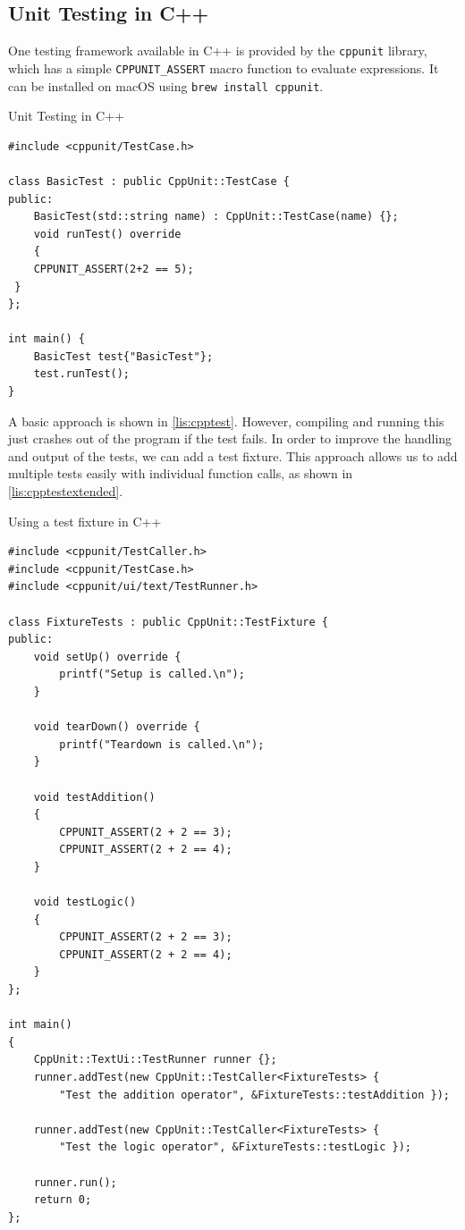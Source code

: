 \subsection{Unit Testing in C++}
One testing framework available in C++ is provided by the \texttt{cppunit} library, which has a simple \texttt{CPPUNIT\_ASSERT} macro function to evaluate expressions. It can be installed on macOS using \texttt{brew install cppunit}.

\begin{listing}[H]
\caption{Unit Testing in C++}
\label{lis:cpptest}
\begin{verbatim}
#include <cppunit/TestCase.h>

class BasicTest : public CppUnit::TestCase {
public:
	BasicTest(std::string name) : CppUnit::TestCase(name) {};
	void runTest() override
	{
	CPPUNIT_ASSERT(2+2 == 5);
 }
};

int main() {
	BasicTest test{"BasicTest"};
	test.runTest();
}
\end{verbatim}
\end{listing}

A basic approach is shown in \autoref{lis:cpptest}. However, compiling and running this just crashes out of the program if the test fails. In order to improve the handling and output of the tests, we can add a test fixture. This approach allows us to add multiple tests easily with individual function calls, as shown in \autoref{lis:cpptestextended}.

\begin{listing}[H]
\caption{Using a test fixture in C++}
\label{lis:cpptestextended}
\begin{verbatim}
#include <cppunit/TestCaller.h>
#include <cppunit/TestCase.h>
#include <cppunit/ui/text/TestRunner.h>

class FixtureTests : public CppUnit::TestFixture {
public:
	void setUp() override {
		printf("Setup is called.\n");
	}

	void tearDown() override {
		printf("Teardown is called.\n");
	}

	void testAddition()
	{
		CPPUNIT_ASSERT(2 + 2 == 3);
		CPPUNIT_ASSERT(2 + 2 == 4);
	}

	void testLogic()
	{
		CPPUNIT_ASSERT(2 + 2 == 3);
		CPPUNIT_ASSERT(2 + 2 == 4);
	}
};

int main()
{
	CppUnit::TextUi::TestRunner runner {};
	runner.addTest(new CppUnit::TestCaller<FixtureTests> {
		"Test the addition operator", &FixtureTests::testAddition });

	runner.addTest(new CppUnit::TestCaller<FixtureTests> {
		"Test the logic operator", &FixtureTests::testLogic });

	runner.run();
	return 0;
};

\end{verbatim}
\end{listing}

